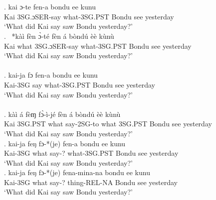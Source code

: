 \documentclass{assets/fieldnotes}
\begin{document}
\\

\\
\exg. kai ɔ-te fen-a bondu ee kunu   \\
Kai  3SG.ɔSER-say what-3SG.PST Bondu see yesterday\\
`What did Kai say saw Bondu yesterday?'\\ 

\exg. \ *kàì fèn ɔ̀-té fèn á bòndú èè kùnù   \\
Kai what 3SG.ɔSER-say what-3SG.PST Bondu see yesterday\\
`What did Kai say saw Bondu yesterday?'\\ 


\\

\exg. kai-ja fɔ fen-a bondu ee kunu   \\
Kai-3SG say what-3SG.PST Bondu see yesterday\\
`What did Kai say saw Bondu yesterday?'\\ 

\\


\exg. kàì á fèɱ fɔ̀-ì-jé fèn á bòndú èè kùnù   \\
Kai 3SG.PST what say-2SG-to what 3SG.PST Bondu see yesterday\\
`What did Kai say saw Bondu yesterday?'\\ 

\exg. kai-ja feŋ fɔ-*(je) fen-a bondu ee kunu   \\
Kai-3SG what say-? what-3SG.PST Bondu see yesterday\\
`What did Kai say saw Bondu yesterday?'\\ 

\exg. kai-ja feŋ fɔ-*(je) fena-mina-na bondu ee kunu   \\
Kai-3SG what say-? thing-REL-NA Bondu see yesterday\\
`What did Kai say saw Bondu yesterday?'\\ 
\end{document}
